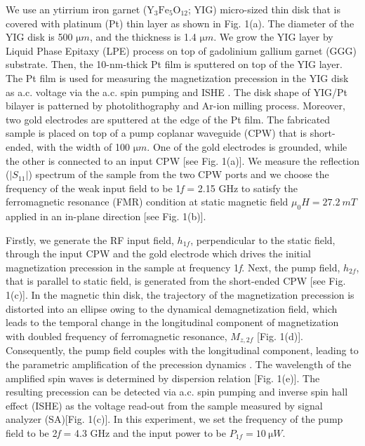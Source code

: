 \documentclass[%
 reprint,
 amsmath,amssymb,
 aps,
prb,
]{revtex4-2}
\begin{document}
We use an ytirrium iron garnet ($\mathrm{Y}_3\mathrm{Fe}_5\mathrm{O}_{12}$; YIG) micro-sized thin disk that is covered with platinum (Pt) thin layer as shown in Fig. 1(a). The diameter of the YIG disk is 500 $\si{\micro m}$, and the thickness is 1.4 $\si{\micro m}$. We grow the YIG layer by Liquid Phase Epitaxy (LPE) process  on top of  gadolinium gallium garnet (GGG) substrate. Then, the 10-nm-thick Pt film is sputtered on top of the YIG layer. The Pt film is used for measuring the magnetization precession in the YIG disk as a.c. voltage via the a.c. spin pumping and ISHE \cite{Wei2014,Hahn2013,Jiao2013,Weiler2014,Saitoh2006,Azevado2005,Kimura2007,Valenzuela2006,Costache2006,Mizukami2002,Kajiwara2010,Tserkovnyak2002}. The disk shape of YIG/Pt bilayer is patterned by photolithography and Ar-ion milling process. Moreover, two gold electrodes are sputtered at the edge of the Pt film. The fabricated sample is placed on top of a pump coplanar waveguide (CPW) that is short-ended, with the width of 100 $\si{\micro m}$. One of the gold electrodes is grounded, while the other is connected to an input CPW [see Fig. 1(a)]. We measure the reflection ($|S_{11}|$) spectrum of the sample from the two CPW ports and we choose the frequency of the weak input field to be 1\textit{f} = 2.15 GHz to satisfy the ferromagnetic resonance (FMR) condition at static magnetic field $\mu_0 H=27.2\ \si{mT}$ applied in an in-plane direction [see Fig. 1(b)].

Firstly, we generate the RF input field, $h_{1f}$, perpendicular to the static field, through the input CPW and the gold electrode which drives the initial magnetization precession in the sample at frequency 1\textit{f}. Next, the pump field, $h_{2f}$, that is parallel to static field, is generated from the short-ended CPW  [see Fig. 1(c)]. In the magnetic thin disk, the trajectory of the magnetization precession is distorted into an ellipse owing to the dynamical demagnetization field, which leads to the temporal change in the longitudinal component of magnetization with doubled frequency of ferromagnetic resonance, $M_{z,2f}$ [Fig. 1(d)]. Consequently, the pump field couples with the longitudinal component, leading to the parametric amplification of the precession dynamics \cite{Makiuchi2021,Brach2016,Hoshi2022}. The wavelength of the amplified spin waves is determined by dispersion relation [Fig. 1(e)]. The resulting precession can be detected via a.c. spin pumping and inverse spin hall effect (ISHE) as the voltage read-out from the sample measured by signal analyzer (SA)[Fig. 1(c)]. In this experiment, we set the frequency of the pump field  to be 2\textit{f} = 4.3 GHz and the input power to be $P_{1f}= 10\ \si{\micro W}$. 
\end{document}
